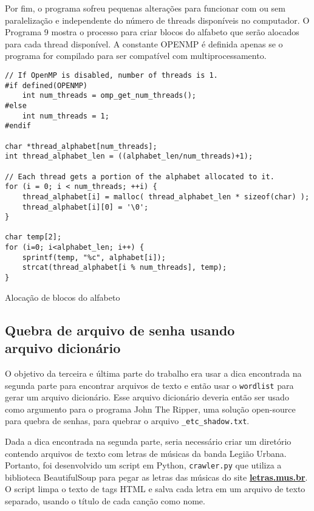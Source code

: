 \documentclass{sig-alternate-05-2015}
\begin{document}
Por fim, o programa sofreu pequenas alterações para funcionar com ou sem paralelização e independente do número de threads disponíveis no computador.
O Programa 9 mostra o processo para criar blocos do alfabeto que serão alocados para cada thread disponível.
A constante OPENMP é definida apenas se o programa for compilado para ser compatível com multiprocessamento.

\begin{program}
\begin{lstlisting}
// If OpenMP is disabled, number of threads is 1.
#if defined(OPENMP)
    int num_threads = omp_get_num_threads();
#else
    int num_threads = 1;
#endif

char *thread_alphabet[num_threads];
int thread_alphabet_len = ((alphabet_len/num_threads)+1);

// Each thread gets a portion of the alphabet allocated to it. 
for (i = 0; i < num_threads; ++i) {
    thread_alphabet[i] = malloc( thread_alphabet_len * sizeof(char) );
    thread_alphabet[i][0] = '\0';
}

char temp[2];
for (i=0; i<alphabet_len; i++) {
    sprintf(temp, "%c", alphabet[i]);
    strcat(thread_alphabet[i % num_threads], temp);
}\end{lstlisting}
\caption{Alocação de blocos do alfabeto}
\end{program}

\subsection{Quebra de arquivo de senha usando\\ arquivo dicionário}

O objetivo da terceira e última parte do trabalho era usar a dica encontrada na segunda parte para encontrar arquivos de texto e então usar o \texttt{wordlist} para gerar um arquivo dicionário.
Esse arquivo dicionário deveria então ser usado como argumento para o programa John The Ripper, uma solução open-source para quebra de senhas, para quebrar o arquivo \texttt{\_etc\_shadow.txt}.

Dada a dica encontrada na segunda parte, seria necessário criar um diretório contendo arquivos de texto com letras de músicas da banda Legião Urbana.
Portanto, foi desenvolvido um script em Python, \texttt{crawler.py} que utiliza a biblioteca BeautifulSoup para pegar as letras das músicas do site \textbf{\url{letras.mus.br}}.
O script limpa o texto de tags HTML e salva cada letra em um arquivo de texto separado, usando o título de cada canção como nome.
\end{document}
